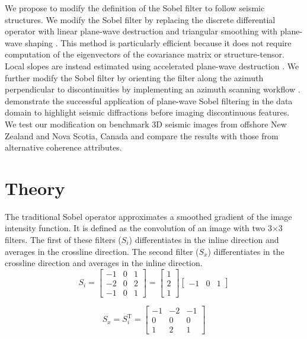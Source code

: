 We propose to modify the definition of the Sobel filter to follow seismic structures. 
We modify the Sobel filter by replacing the discrete differential operator with linear plane-wave destruction \cite[]{fomel02} and triangular smoothing with plane-wave shaping \cite[]{fomel07,swindeman,phillips}.
This method is particularly efficient because it does not require computation of the eigenvectors of the covariance matrix or structure-tensor.
Local slopes are instead estimated using accelerated plane-wave destruction \cite[]{apwd}.
We further modify the Sobel filter by orienting the filter along the azimuth perpendicular to discontinuities by implementing an azimuth scanning workflow \cite[]{merzlikin}.
\cite{urtec} demonstrate the successful application of plane-wave Sobel filtering in the data domain to highlight seismic diffractions before imaging discontinuous features.
We test our modification on benchmark 3{D} seismic images from offshore New Zealand and Nova Scotia, Canada and compare the results with those from alternative coherence attributes.

\section{Theory}
The traditional Sobel operator approximates a smoothed gradient of the image intensity function. 
It is defined as the convolution of an image with two 3$\times$3 filters.
The first of these filters ($S_i$) differentiates in the inline direction and averages in the crossline direction.
The second filter ($S_x$) differentiates in the crossline direction and averages in the inline direction.
\begin{equation}
S_i=\left[
\begin{array}{rrr}
-1 & 0 & 1 \\
-2 & 0 & 2 \\
-1 & 0 & 1
\end{array}
\right]=\left[
\begin{array}{c}
1 \\
2 \\
1
\end{array}
\right]\left[
\begin{array}{ccc}
-1 & 0 & 1
\end{array}
\right]
\end{equation}

\begin{equation}
S_x=S_i^{\mathrm{T}}=\left[
\begin{array}{rrr}
-1 & -2 & -1 \\
0 & 0 & 0 \\
1 & 2 & 1
\end{array}
\right]
\end{equation}

